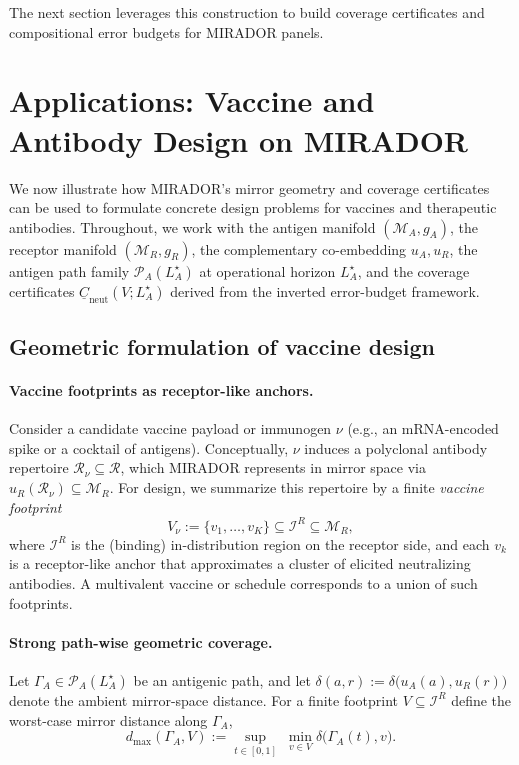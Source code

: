 \documentclass[11pt]{article}
\begin{document}
The next section leverages this construction to build coverage certificates and
compositional error budgets for MIRADOR panels.

\section{Applications: Vaccine and Antibody Design on MIRADOR}
\label{sec:mirador-applications}

We now illustrate how MIRADOR’s mirror geometry and coverage certificates can be used to
formulate concrete design problems for vaccines and therapeutic antibodies. Throughout, we work
with the antigen manifold $(\mathcal{M}_A,g_A)$, the receptor manifold $(\mathcal{M}_R,g_R)$, the
complementary co-embedding $u_A,u_R$, the antigen path family
$\mathcal{P}_A(L_A^\star)$ at operational horizon $L_A^\star$, and the coverage certificates
$\underline{C}_{\mathrm{neut}}(V;L_A^\star)$ derived from the inverted error-budget framework.

\subsection{Geometric formulation of vaccine design}
\label{subsec:geo-vaccine-design}

\paragraph{Vaccine footprints as receptor-like anchors.}
Consider a candidate vaccine payload or immunogen $\nu$ (e.g., an mRNA-encoded spike or a
cocktail of antigens). Conceptually, $\nu$ induces a polyclonal antibody repertoire
$\mathcal{R}_\nu \subseteq \mathcal{R}$, which MIRADOR represents in mirror space via
$u_R(\mathcal{R}_\nu) \subseteq \mathcal{M}_R$. For design, we summarize this repertoire by a
finite \emph{vaccine footprint}
\[
  V_\nu := \{v_1,\dots,v_K\} \subseteq \mathcal{I}^R \subseteq \mathcal{M}_R,
\]
where $\mathcal{I}^R$ is the (binding) in-distribution region on the receptor side, and each
$v_k$ is a receptor-like anchor that approximates a cluster of elicited neutralizing antibodies.
A multivalent vaccine or schedule corresponds to a union of such footprints.

\paragraph{Strong path-wise geometric coverage.}
Let $\Gamma_A \in \mathcal{P}_A(L_A^\star)$ be an antigenic path, and let
$\delta(a,r) := \delta\bigl(u_A(a),u_R(r)\bigr)$ denote the ambient mirror-space distance.
For a finite footprint $V \subseteq \mathcal{I}^R$ define the worst-case mirror distance along
$\Gamma_A$,
\begin{equation}
  d_{\max}(\Gamma_A,V)
  := \sup_{t \in [0,1]} \;\min_{v \in V} \delta\bigl(\Gamma_A(t),v\bigr).
\end{equation}
\end{document}
